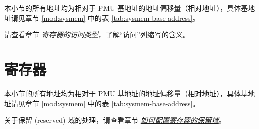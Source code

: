 \documentclass[main\_\_CN.tex]{subfiles}
\begin{document}
本小节的所有地址均为相对于 PMU 基地址的地址偏移量（相对地址），具体基地址请见章节 \ref{mod:sysmem} \textit{} 中的表 \ref{tab:sysmem-base-address}。

请查看章节 \hyperref[glossary-access-types]{\textit{寄存器的访问类型}}，了解“访问”列缩写的含义。



\section{寄存器}

本小节的所有地址均为相对于 PMU 基地址的地址偏移量（相对地址），具体基地址请见章节 \ref{mod:sysmem} \textit{} 中的表 \ref{tab:sysmem-base-address}。

关于保留 (reserved) 域的处理，请查看章节 \hyperref[programming-reserved-field]{\textit{如何配置寄存器的保留域}}。


\end{document}
